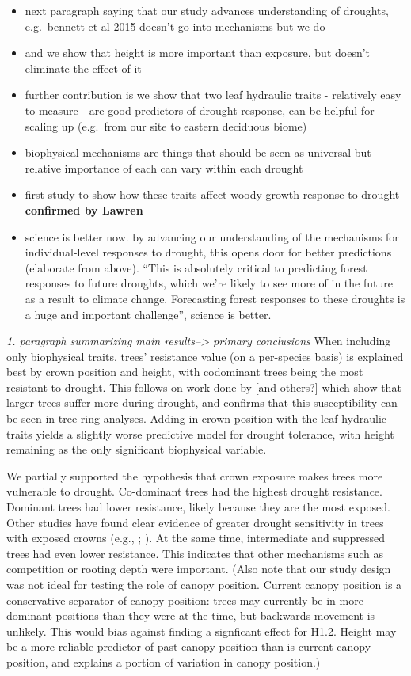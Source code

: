 \documentclass[]{article}
\begin{document}
\begin{itemize}
\item
  next paragraph saying that our study advances understanding of
  droughts, e.g.~bennett et al 2015 doesn't go into mechanisms but we do
\item
  and we show that height is more important than exposure, but doesn't
  eliminate the effect of it
\item
  further contribution is we show that two leaf hydraulic traits -
  relatively easy to measure - are good predictors of drought response,
  can be helpful for scaling up (e.g.~from our site to eastern deciduous
  biome)
\item
  biophysical mechanisms are things that should be seen as universal but
  relative importance of each can vary within each drought
\item
  first study to show how these traits affect woody growth response to
  drought \textbf{confirmed by Lawren}
\item
  science is better now. by advancing our understanding of the
  mechanisms for individual-level responses to drought, this opens door
  for better predictions (elaborate from above). ``This is absolutely
  critical to predicting forest responses to future droughts, which
  we're likely to see more of in the future as a result to climate
  change. Forecasting forest responses to these droughts is a huge and
  important challenge'', science is better.
\end{itemize}

\emph{1. paragraph summarizing main results--\textgreater{} primary
conclusions} When including only biophysical traits, trees' resistance
value (on a per-species basis) is explained best by crown position and
height, with codominant trees being the most resistant to drought. This
follows on work done by \citep{bennett_larger_2015} {[}and others?{]}
which show that larger trees suffer more during drought, and confirms
that this susceptibility can be seen in tree ring analyses. Adding in
crown position with the leaf hydraulic traits yields a slightly worse
predictive model for drought tolerance, with height remaining as the
only significant biophysical variable.

We partially supported the hypothesis that crown exposure makes trees
more vulnerable to drought. Co-dominant trees had the highest drought
resistance. Dominant trees had lower resistance, likely because they are
the most exposed. Other studies have found clear evidence of greater
drought sensitivity in trees with exposed crowns (e.g.,
\citep{suarez_factors_2004}; \citep{scharnweber_confessions_2019}). At
the same time, intermediate and suppressed trees had even lower
resistance. This indicates that other mechanisms such as competition or
rooting depth were important. (Also note that our study design was not
ideal for testing the role of canopy position. Current canopy position
is a conservative separator of canopy position: trees may currently be
in more dominant positions than they were at the time, but backwards
movement is unlikely. This would bias against finding a signficant
effect for H1.2. Height may be a more reliable predictor of past canopy
position than is current canopy position, and explains a portion of
variation in canopy position.)
\end{document}
